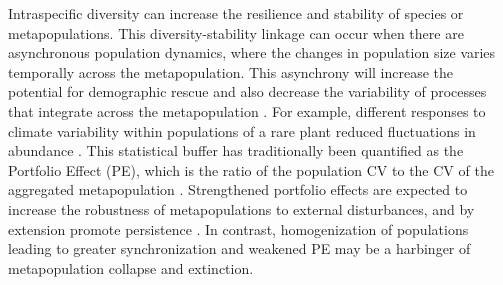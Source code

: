 \documentclass{revtex4}
\begin{document}
Intraspecific diversity can increase the resilience and stability of species or metapopulations. 
This diversity-stability linkage can occur when there are asynchronous population dynamics, where the changes in population size varies temporally across the metapopulation. 
This asynchrony will increase the potential for demographic rescue \citep{Brown:1977gk,Earn:2000fm} and also decrease the variability of processes that integrate across the metapopulation \citep{Anonymous:2015gf}. 
For example, different responses to climate variability within populations of a rare plant reduced fluctuations in abundance \citep{Abbott:2017hl}. 
This statistical buffer has traditionally been quantified as the Portfolio Effect (PE), which is the ratio of the population CV to the CV of the aggregated metapopulation \citep{Thibaut:2012km}. 
Strengthened portfolio effects are expected to increase the robustness of metapopulations to external disturbances, and by extension promote persistence \citep{Thibaut:2012km}.
In contrast, homogenization of populations leading to greater synchronization and weakened PE may be a harbinger of metapopulation collapse and extinction.
\end{document}
